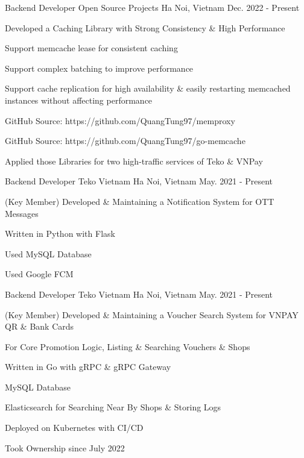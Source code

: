 \begin{cventries}
\cventry
{Backend Developer} %
{Open Source Projects} %
{Ha Noi, Vietnam} %
{Dec. 2022 - Present} %
{ %
\begin{cvitems}
\item{Developed a Caching Library with Strong Consistency \& High Performance}
\item{Support memcache lease for consistent caching}
\item{Support complex batching to improve performance}
\item{Support cache replication for high availability \& easily restarting memcached instances without affecting performance}
\item{GitHub Source: https://github.com/QuangTung97/memproxy}
\item{GitHub Source: https://github.com/QuangTung97/go-memcache}
\item{Applied those Libraries for two high-traffic services of Teko \& VNPay}
\end{cvitems}
}


\cventry
{Backend Developer} %
{Teko Vietnam} %
{Ha Noi, Vietnam} %
{May. 2021 - Present} %
{ %
\begin{cvitems}
\item{(Key Member) Developed \& Maintaining a Notification System for OTT Messages}
\item{Written in Python with Flask}
\item{Used MySQL Database}
\item{Used Google FCM}
\end{cvitems}
}


\cventry
{Backend Developer} %
{Teko Vietnam} %
{Ha Noi, Vietnam} %
{May. 2021 - Present} %
{ %
\begin{cvitems}
\item{(Key Member) Developed \& Maintaining a Voucher Search System for VNPAY QR \& Bank Cards}
\item{For Core Promotion Logic, Listing \& Searching Vouchers \& Shops}
\item{Written in Go with gRPC \& gRPC Gateway}
\item{MySQL Database}
\item{Elasticsearch for Searching Near By Shops \& Storing Logs}
\item{Deployed on Kubernetes with CI/CD}
\item{Took Ownership since July 2022}
\end{cvitems}
}


\end{cventries}
